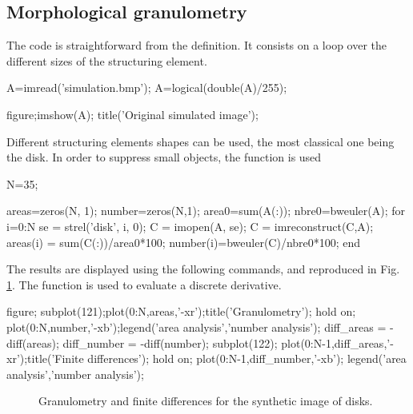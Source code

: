 \def\QRCODE{TB_IPR_TUT.IMG.granulometry_matlabqrcode.png}
\def\QRPAGE{http://www.iptutorials.science/tree/master/TB_IPR/TUT.IMG.granulometry/matlab}


\subsection{Morphological granulometry}
The code is straightforward from the definition. It consists on a loop over the different sizes of the structuring element. 
\begin{matlab}
A=imread('simulation.bmp');
A=logical(double(A)/255);

figure;imshow(A);
title('Original simulated image');
\end{matlab}

Different structuring elements shapes can be used, the most classical one being the disk. In order to suppress small objects, the function  is used 
\begin{matlab}
N=35;

areas=zeros(N, 1);
number=zeros(N,1);
area0=sum(A(:));
nbre0=bweuler(A);
for i=0:N
   se = strel('disk', i, 0); %
   C = imopen(A, se);        %
   C = imreconstruct(C,A);   %
   areas(i) = sum(C(:))/area0*100;  %
   number(i)=bweuler(C)/nbre0*100;%
end
\end{matlab}
The results are displayed using the following commands, and reproduced in Fig. \ref{fig:granulometry:matlab:granulo}. The function  is used to evaluate a discrete derivative.

\begin{matlab}
figure;
subplot(121);plot(0:N,areas,'-xr');title('Granulometry');
hold on; plot(0:N,number,'-xb');legend('area analysis','number analysis');
diff_areas = -diff(areas);
diff_number = -diff(number);
subplot(122);
plot(0:N-1,diff_areas,'-xr');title('Finite differences');
hold on; plot(0:N-1,diff_number,'-xb');
legend('area analysis','number analysis');
\end{matlab}

\begin{figure}[htbp]
\centering
 
 \caption{Granulometry and finite differences for the synthetic image of disks.}
 \label{fig:granulometry:matlab:granulo}
\end{figure}

